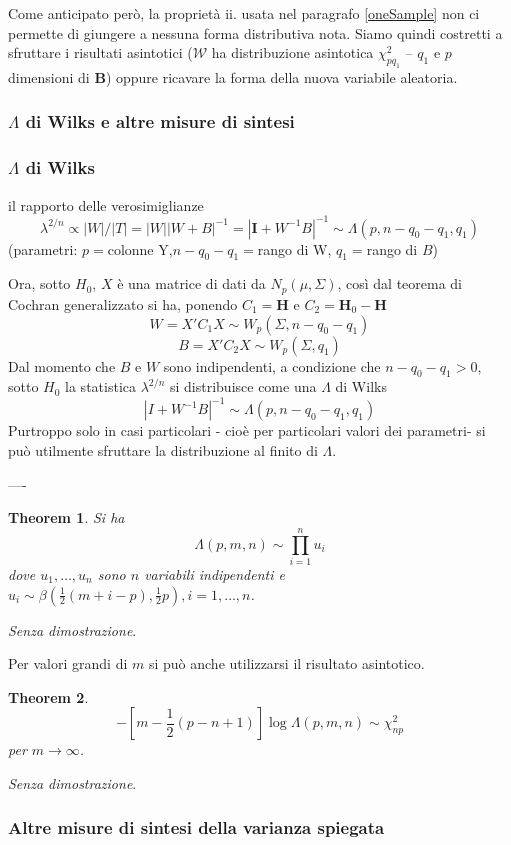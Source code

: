 \documentclass[10pt]{article}
\newtheorem{thm}{Theorem}[section]
\newcommand{\bfB}{\mathbf{B}}
\newcommand{\HH}{\mathbf{H}}
\newcommand{\I}{\mathbf{I}}
\begin{document}
Come anticipato per\`o, la proprietà ii. usata nel paragrafo \ref{oneSample} non ci permette di giungere a nessuna forma distributiva nota. 
Siamo quindi costretti a sfruttare i risultati asintotici ($\mathcal{W}$ ha distribuzione asintotica $\chi^2_{pq_1}$ -- $q_1$ e $p$ dimensioni di $\bfB$)  
oppure ricavare la forma della nuova variabile aleatoria.


\subsubsection{$\Lambda$ di Wilks e altre misure di sintesi}
\subsubsection*{$\Lambda$ di Wilks}
il rapporto delle verosimiglianze 
$$\lambda^{2/n} \propto |W| /|T| =  |W| |W+B|^{-1} =  |\I +W^{-1}B|^{-1} \sim \Lambda(p,n-q_0-q_1,q_1) $$
(parametri: $p=$colonne Y,$n-q_0-q_1=$rango di W, $q_1=$rango di $B$)



Ora, sotto $H_0$, $X$ \`e una matrice di dati da $N_p(\mu,\Sigma)$, cos\`i dal teorema
di Cochran generalizzato si ha, ponendo  $C_1=\HH$ e $C_2=\HH_0-\HH$ 
$$
W=X'C_1X \sim W_p(\Sigma,n-q_0-q_1)
$$
$$
B=X'C_2X \sim W_p(\Sigma,q_1)
$$
Dal momento che $B$ e $W$ sono indipendenti, a condizione che $n-q_0-q_1> 0$,
sotto $H_0$ la statistica $\lambda^{2/n}$ si distribuisce come una $\Lambda$ di
Wilks
$$
|I+W^{-1}B|^{-1} \sim \Lambda(p,n-q_0-q_1,q_1)
$$
Purtroppo solo in casi particolari - cio\`e per particolari valori dei parametri-
si pu\`o utilmente sfruttare la distribuzione al finito di $\Lambda$.


----

\begin{thm}
Si ha
$$
\Lambda(p,m,n) \sim \prod_{i=1}^nu_i
$$
dove $u_1,\ldots,u_n$ sono $n$ variabili indipendenti e $u_i \sim \beta(\frac{1}{2}
(m+i-p), \frac{1}{2}p), i=1,\ldots,n$.
\end{thm}
{\em Senza dimostrazione}.

Per valori grandi di $m$ si pu\`o anche utilizzarsi il risultato asintotico.\\

\begin{thm} 
$$
-[m-\frac{1}{2}(p-n+1)]\log\Lambda(p,m,n) \sim \chi^2_{np}
$$
per $m \rightarrow \infty$.
\end{thm} 
{\em Senza dimostrazione}.


\subsubsection*{Altre misure di sintesi della varianza spiegata}
\end{document}
